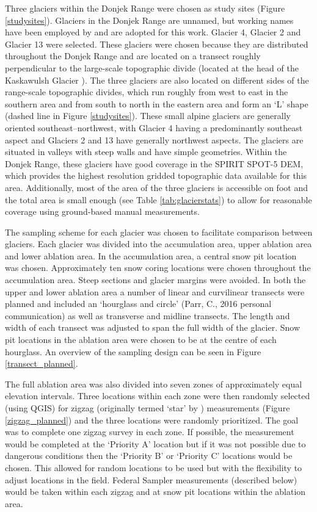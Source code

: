 \documentclass{sfuthesis}
\begin{document}
Three glaciers within the Donjek Range were chosen as study sites (Figure \ref{studysites}). Glaciers in the Donjek Range are unnamed, but working names have been employed by \cite{Crompton2016} and are adopted for this work. Glacier 4, Glacier 2 and Glacier 13 were selected. These glaciers were chosen because they are distributed throughout the Donjek Range and are located on a transect roughly perpendicular to the large-scale topographic divide (located at the head of the Kaskawulsh Glacier \citep{Taylor1969}). The three glaciers are also located on different sides of the range-scale topographic divides, which run roughly from west to east in the southern area and from south to north in the eastern area and form an `L' shape (dashed line in Figure \ref{studysites}). These small alpine glaciers are generally oriented southeast--northwest, with Glacier 4 having a predominantly southeast aspect and Glaciers 2 and 13 have generally northwest aspects. The glaciers are situated in valleys with steep walls and have simple geometries. Within the Donjek Range, these glaciers have good coverage in the SPIRIT SPOT-5 DEM, which provides the highest resolution gridded topographic data available for this area. Additionally, most of the area of the three glaciers is accessible on foot and the total area is small enough (see Table \ref{tab:glacierstats}) to allow for reasonable coverage using ground-based manual measurements.

The sampling scheme for each glacier was chosen to facilitate comparison between glaciers. Each glacier was divided into the accumulation area, upper ablation area and lower ablation area. In the accumulation area, a central snow pit location was chosen. Approximately ten snow coring locations were chosen throughout the accumulation area. Steep sections and glacier margins were avoided. In both the upper and lower ablation area a number of linear and curvilinear transects were planned and included an `hourglass and circle' (Parr, C., 2016 personal communication) as well as transverse and midline transects. The length and width of each transect was adjusted to span the full width of the glacier. Snow pit locations in the ablation area were chosen to be at the centre of each hourglass. An overview of the sampling design can be seen in Figure \ref{transect_planned}.

The full ablation area was also divided into seven zones of approximately equal elevation intervals. Three locations within each zone were then randomly selected (using QGIS) for zigzag (originally termed `star' by \cite{Shea2010}) measurements (Figure \ref{zigzag_planned}) and the three locations were randomly prioritized. The goal was to complete one zigzag survey in each zone. If possible, the measurement would be completed at the `Priority A' location but if it was not possible due to dangerous conditions then the `Priority B' or `Priority C' locations would be chosen. This allowed for random locations to be used but with the flexibility to adjust locations in the field. Federal Sampler measurements (described below) would be taken within each zigzag and at snow pit locations within the ablation area.  
\end{document}
